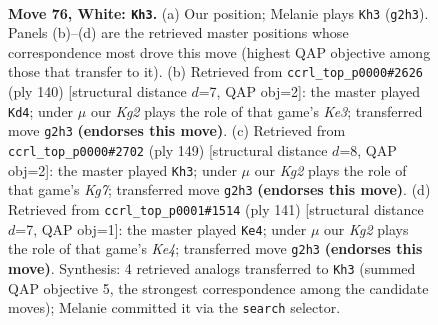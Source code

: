 \documentclass[11pt]{article}
\begin{document}
\clearpage

\begin{figure}[p]\centering
\begin{subfigure}{0.46\textwidth}\centering
\resizebox{\linewidth}{!}{%
\newchessgame
\chessboard[
  setfen={5r1k/P3R3/8/8/8/8/6K1/8 w - - 21 76},
  showmover=false,
  pgfstyle=straightmove, color=movearrow, markmove={g2-h3}
]}
\caption{}
\end{subfigure}\hfill
\begin{subfigure}{0.46\textwidth}\centering
\resizebox{\linewidth}{!}{%
\newchessgame
\chessboard[
  setfen={5r2/8/5k2/3P4/8/4K1R1/8/8 w - - 3 71},
  showmover=false,
  pgfstyle=straightmove, color=movearrow, markmove={e3-d4}
]}
\caption{}
\end{subfigure}
\\[4pt]
\begin{subfigure}{0.46\textwidth}\centering
\resizebox{\linewidth}{!}{%
\newchessgame
\chessboard[
  setfen={8/4r3/1K3R2/6pB/8/8/6k1/8 b - - 5 75},
  showmover=false,
  pgfstyle=straightmove, color=movearrow, markmove={g2-h3}
]}
\caption{}
\end{subfigure}\hfill
\begin{subfigure}{0.46\textwidth}\centering
\resizebox{\linewidth}{!}{%
\newchessgame
\chessboard[
  setfen={5R2/8/8/4k1pP/8/6r1/2K5/8 b - - 9 71},
  showmover=false,
  pgfstyle=straightmove, color=movearrow, markmove={e5-e4}
]}
\caption{}
\end{subfigure}
\caption{\textbf{Move 76, White: \texttt{Kh3}.} (a) Our position; Melanie plays \texttt{Kh3} (\texttt{g2h3}). Panels (b)--(d) are the retrieved master positions whose correspondence most drove this move (highest QAP objective among those that transfer to it). (b) Retrieved from \texttt{ccrl\_top\_p0000\#2626} (ply 140) [structural distance $d$=7, QAP obj=2]: the master played \texttt{Kd4}; under $\mu$ our \emph{Kg2} plays the role of that game's \emph{Ke3}; transferred move \texttt{g2h3} \textbf{(endorses this move)}. (c) Retrieved from \texttt{ccrl\_top\_p0000\#2702} (ply 149) [structural distance $d$=8, QAP obj=2]: the master played \texttt{Kh3}; under $\mu$ our \emph{Kg2} plays the role of that game's \emph{Kg7}; transferred move \texttt{g2h3} \textbf{(endorses this move)}. (d) Retrieved from \texttt{ccrl\_top\_p0001\#1514} (ply 141) [structural distance $d$=7, QAP obj=1]: the master played \texttt{Ke4}; under $\mu$ our \emph{Kg2} plays the role of that game's \emph{Ke4}; transferred move \texttt{g2h3} \textbf{(endorses this move)}. Synthesis: 4 retrieved analogs transferred to \texttt{Kh3} (summed QAP objective 5, the strongest correspondence among the candidate moves); Melanie committed it via the \texttt{search} selector.}
\label{fig:thought-m150}
\end{figure}
\end{document}
